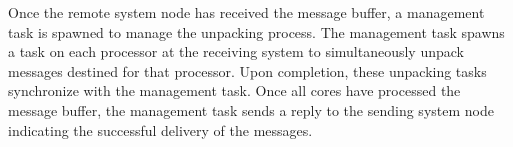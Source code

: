 Once the remote system node has received the message buffer, a
management task is spawned to manage the unpacking process.  The
management task spawns a task on each processor at the receiving
system to simultaneously unpack messages destined for that processor.
Upon completion, these unpacking tasks synchronize with the management
task.  Once all cores have processed the message buffer, the management
task sends a reply to the sending system node indicating the
successful delivery of the messages.




%
%
%
%
%
% 
% 
% 
